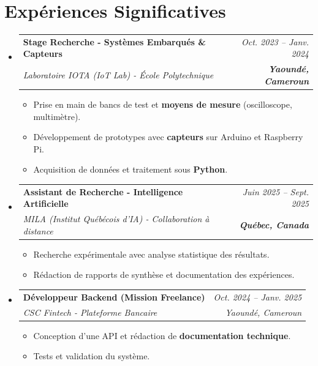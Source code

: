 \documentclass[a4paper,11pt]{article}
\makeatletter
\newcommand{\resumeSubheading}[4]{
  \vspace{-1pt}\item
    \begin{tabular*}{0.97\textwidth}[t]{l@{\extracolsep{\fill}}r}
      \textbf{#1} & \textit{\small #2} \\
      \textit{\small #3} & \textit{\small #4} \\
    \end{tabular*}\vspace{-5pt}
}
\makeatother
\begin{document}
\section{Expériences Significatives}
\begin{itemize}[leftmargin=*, label={}]

    \resumeSubheading
      {Stage Recherche - Systèmes Embarqués \& Capteurs}{Oct. 2023 -- Janv. 2024}
      {Laboratoire IOTA (IoT Lab) - École Polytechnique}{\textbf{Yaoundé, Cameroun}}
      \begin{itemize}[leftmargin=0.4cm, nosep, label=\tiny$\bullet$]
        \item \small{Prise en main de bancs de test et \textbf{moyens de mesure} (oscilloscope, multimètre).}
        \item \small{Développement de prototypes avec \textbf{capteurs} sur Arduino et Raspberry Pi.}
        \item \small{Acquisition de données et traitement sous \textbf{Python}.}
      \end{itemize}
    \vspace{2pt}

    \resumeSubheading
      {Assistant de Recherche - Intelligence Artificielle}{Juin 2025 -- Sept. 2025}
      {MILA (Institut Québécois d'IA) - Collaboration à distance}{\textbf{Québec, Canada}}
      \begin{itemize}[leftmargin=0.4cm, nosep, label=\tiny$\bullet$]
        \item \small{Recherche expérimentale avec analyse statistique des résultats.}
        \item \small{Rédaction de rapports de synthèse et documentation des expériences.}
      \end{itemize}
    \vspace{2pt}

    \resumeSubheading
      {Développeur Backend (Mission Freelance)}{Oct. 2024 -- Janv. 2025}
      {CSC Fintech - Plateforme Bancaire}{Yaoundé, Cameroun}
      \begin{itemize}[leftmargin=0.4cm, nosep, label=\tiny$\bullet$]
        \item \small{Conception d'une API et rédaction de \textbf{documentation technique}.}
        \item \small{Tests et validation du système.}
      \end{itemize}
\end{itemize}

\end{document}
